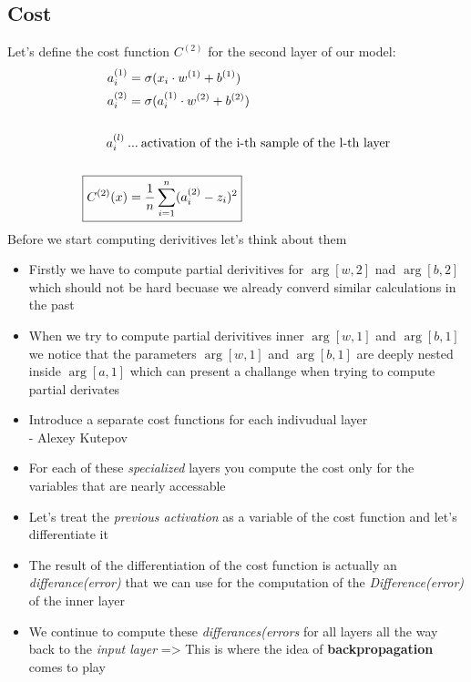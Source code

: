 \documentclass{article}
\begin{document}
\subsection{Cost}
Let's define the cost function $C^{(2)}$ for the second layer of our model:
\begin{align}
    a_i^{(1)} &= \sigma(x_i \cdot w^{(1)} + b^{(1)})\\
    a_i^{(2)} &= \sigma(a_i^{(1)} \cdot \arg[w, 2] + \arg[b, 2])\\
    \\
    \text{$a_i^{(l)}$}  \: &\text{...} \: \text{activation of the i-th sample of the l-th layer}
    \\
    \\
    \Aboxed{C^{(2)}(x) &= \avgsum[i, n](a_i^{(2)} - z_i)^2} 
\end{align}
Before we start computing derivitives let's think about them \\
\begin{itemize}
    \item {Firstly we have to compute partial derivitives for $\arg[w, 2]$ nad $\arg[b, 2]$ which should not be hard becuase we already converd similar calculations in the past}
    \item {When we try to compute partial derivitives inner $\arg[w, 1]$ and $\arg[b, 1]$ we notice that the parameters $\arg[w, 1]$ and $\arg[b, 1]$ are deeply nested inside $\arg[a, 1]$ which can present a challange when trying to compute partial derivates}
    \item {Introduce a separate cost functions for each indivudual layer\\
                                                        - Alexey Kutepov}
    \item {For each of these \textit{specialized} layers you compute the cost only for the variables that are nearly accessable}
    \item {Let's treat the \textit{previous activation} as a variable of the cost function and let's differentiate it}
    \item {The result of the differentiation of the cost function is actually an \textit{differance(error)} that we can use for the computation of the \textit{Difference(error)} of the inner layer}
    \item {We continue to compute these \textit{differances(errors} for all layers all the way back to the \textit{input layer} => This is where the idea of \textbf{backpropagation} comes to play}
\end{itemize}
\end{document}
